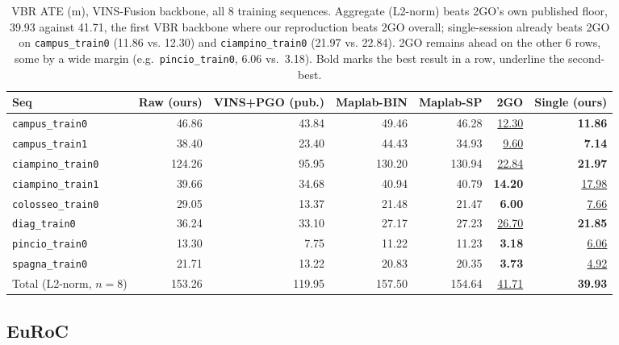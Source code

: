 \begin{table}[htb]
  \centering
  \footnotesize
  \begin{tabular*}{\textwidth}{@{\extracolsep{\fill}} lrrrrrr}
  \hline
  \textbf{Seq} & \textbf{Raw (ours)} & \textbf{VINS+PGO (pub.)} & \textbf{Maplab-BIN} & \textbf{Maplab-SP} & \textbf{2GO} & \textbf{Single (ours)} \\
  \hline
  \texttt{campus\_train0} & 46.86 & 43.84 & 49.46 & 46.28 & \underline{12.30} & \textbf{11.86} \\
  \texttt{campus\_train1} & 38.40 & 23.40 & 44.43 & 34.93 & \underline{9.60} & \textbf{7.14} \\
  \texttt{ciampino\_train0} & 124.26 & 95.95 & 130.20 & 130.94 & \underline{22.84} & \textbf{21.97} \\
  \texttt{ciampino\_train1} & 39.66 & 34.68 & 40.94 & 40.79 & \textbf{14.20} & \underline{17.98} \\
  \texttt{colosseo\_train0} & 29.05 & 13.37 & 21.48 & 21.47 & \textbf{6.00} & \underline{7.66} \\
  \texttt{diag\_train0} & 36.24 & 33.10 & 27.17 & 27.23 & \underline{26.70} & \textbf{21.85} \\
  \texttt{pincio\_train0} & 13.30 & 7.75 & 11.22 & 11.23 & \textbf{3.18} & \underline{6.06} \\
  \texttt{spagna\_train0} & 21.71 & 13.22 & 20.83 & 20.35 & \textbf{3.73} & \underline{4.92} \\
  \hline
  Total (L2-norm, $n{=}8$) & 153.26 & 119.95 & 157.50 & 154.64 & \underline{41.71} & \textbf{39.93} \\
  \hline
  \end{tabular*}
  \caption[VBR ATE, VINS-Fusion backbone]{VBR ATE (m), VINS-Fusion backbone, all 8 training
    sequences. Aggregate (L2-norm) beats 2GO's own published floor, 39.93 against 41.71, the first
    VBR backbone where our reproduction beats 2GO overall; single-session already beats 2GO on
    \texttt{campus\_train0} (11.86 vs. 12.30) and \texttt{ciampino\_train0} (21.97 vs. 22.84). 2GO
    remains ahead on the other 6 rows, some by a wide margin (e.g.\ \texttt{pincio\_train0}, 6.06
    vs.\ 3.18). Bold marks the best result in a row, underline the second-best.}
  \label{tab:experiments-vbr-vins}
\end{table}

\subsection{EuRoC}
\label{sec:experiments-main-euroc}

